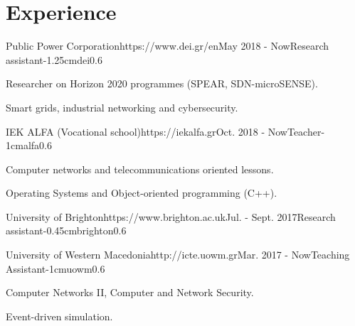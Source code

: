 \documentclass{mycv}
\begin{document}
	\section{Experience}
		\begin{EntryDatedLogo}{Public Power Corporation}{https://www.dei.gr/en}{May 2018 - Now}{Research assistant}{-1.25cm}{dei}{0.6}
		\begin{Itemize}
			\item Researcher on Horizon 2020 programmes (SPEAR, SDN-microSENSE).
			\item Smart grids, industrial networking and cybersecurity.
		\end{Itemize}
	\end{EntryDatedLogo}
	
	\vspace*{0.5cm}
	
	\begin{EntryDatedLogo}{IEK ALFA (Vocational school)}{https://iekalfa.gr}{Oct. 2018 - Now}{Teacher}{-1cm}{alfa}{0.6}
		\begin{Itemize}
			\item Computer networks and telecommunications oriented lessons.
			\item Operating Systems and Object-oriented programming (C++).
		\end{Itemize}
	\end{EntryDatedLogo}

	\vspace*{0.5cm}
		
	\begin{EntryDatedLogo}{University of Brighton}{https://www.brighton.ac.uk}{Jul. - Sept. 2017}{Research assistant}{-0.45cm}{brighton}{0.6}
	\end{EntryDatedLogo}

	\vspace*{0.5cm}	

	\begin{EntryDatedLogo}{University of Western Macedonia}{http://icte.uowm.gr}{Mar. 2017 - Now}{Teaching Assistant}{-1cm}{uowm}{0.6}
	\begin{Itemize}
		\item Computer Networks II, Computer and Network Security.
		\item Event-driven simulation.
	\end{Itemize}
	\end{EntryDatedLogo}
\end{document}
